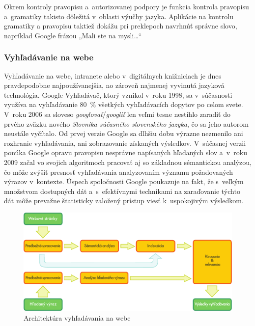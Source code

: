 \begin{multicols}{2}
Okrem kontroly pravopisu a~autorizovanej podpory je funkcia kontrola
pravopisu a~gramatiky takisto dôležitá v~oblasti výučby jazyka. Aplikácie na kontrolu gramatiky a pravopisu taktiež dokážu pri preklepoch navrhnúť správne slovo, napríklad Google frázou „Mali ste na mysli\dots“

\subsubsection{Vyhľadávanie na webe}
Vyhľadávanie na webe, intranete alebo v~digitálnych knižniciach je dnes pravdepodobne najpoužívanejšia, no zároveň najmenej vyvinutá jazyková technológia. Google Vyhľadávač, ktorý vznikol v~roku 1998, sa v~súčasnosti využíva na vyhľadávanie 80~\% všetkých vyhľadávacích dopytov po celom svete. V~roku 2006 sa sloveso \emph{googlovať}/\emph{googliť} len veľmi tesne nestihlo zaradiť do prvého zväzku nového \emph{Slovníka súčasného slovenského jazyka}, čo sa jeho autorom neustále vyčítalo. Od prvej verzie Google sa dlhšiu dobu výrazne nezmenilo ani rozhranie vyhľadávania, ani zobrazovanie získaných výsledkov. V~súčasnej verzii ponúka Google opravu pravopisu nesprávne napísaných hľadaných slov a~v~roku 2009 začal vo svojich algoritmoch pracovať aj so základnou sémantickou analýzou\cite{pc1}, čo môže zvýšiť presnosť vyhľadávania analyzovaním významu požadovaných výrazov v~kontexte. Úspech spoločnosti Google poukazuje na fakt, že s~veľkým množstvom dostupných dát a~s~efektívnymi technikami na zaraďovanie týchto dát môže prevažne štatisticky založený prístup viesť k~uspokojivým výsledkom.

\begin{figure}[htb]
  \center
  \includegraphics[width=\textwidth]{../_media/slovak/web_search_architecture}
  \caption{Architektúra vyhľadávania na webe}
  \label{fig:websearcharch_sk}
\end{figure}


\end{multicols}
